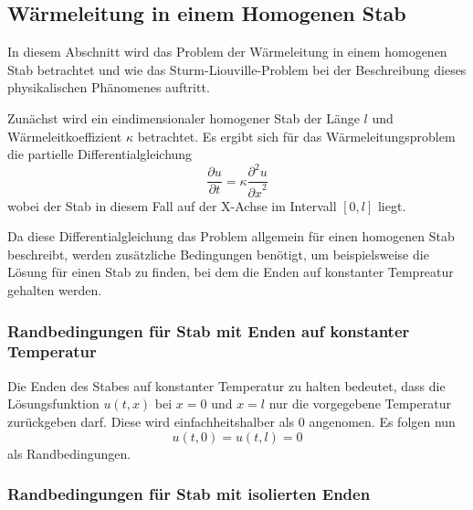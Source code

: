 %
%
%

\subsection{Wärmeleitung in einem Homogenen Stab}

In diesem Abschnitt wird das Problem der Wärmeleitung in einem homogenen Stab
betrachtet und wie das Sturm-Liouville-Problem bei der Beschreibung dieses
physikalischen Phänomenes auftritt.

Zunächst wird ein eindimensionaler homogener Stab der Länge $l$ und
Wärmeleitkoeffizient $\kappa$ betrachtet.
Es ergibt sich für das Wärmeleitungsproblem
die partielle Differentialgleichung
\begin{equation}
    \label{sturmliouville:eq:example-fourier-heat-equation}
    \frac{\partial u}{\partial t} =
    \kappa \frac{\partial^{2}u}{{\partial x}^{2}}
\end{equation}
wobei der Stab in diesem Fall auf der X-Achse im Intervall $[0,l]$ liegt.

Da diese Differentialgleichung das Problem allgemein für einen homogenen
Stab beschreibt, werden zusätzliche Bedingungen benötigt, um beispielsweise
die Lösung für einen Stab zu finden, bei dem die Enden auf konstanter 
Tempreatur gehalten werden.

%
%
\subsubsection{Randbedingungen für Stab mit Enden auf konstanter Temperatur}

Die Enden des Stabes auf konstanter Temperatur zu halten bedeutet, dass die
Lösungsfunktion $u(t,x)$ bei $x = 0$ und $x = l$ nur die vorgegebene
Temperatur zurückgeben darf. Diese wird einfachheitshalber als $0$ angenomen.
Es folgen nun
\begin{equation}
    \label{sturmliouville:eq:example-fourier-boundary-condition-ends-constant}
    u(t,0)
    =
    u(t,l)
    =
    0
\end{equation}
als Randbedingungen.

%
%

\subsubsection{Randbedingungen für Stab mit isolierten Enden}

